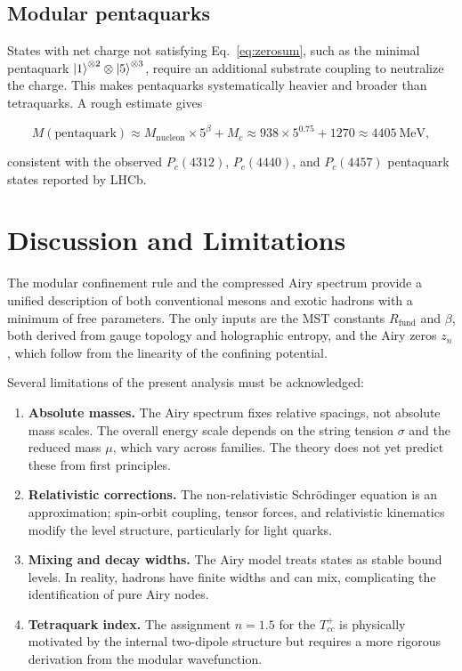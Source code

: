 \documentclass[12pt,a4paper]{article}
\theoremstyle{plain}
\theoremstyle{definition}
\theoremstyle{remark}
\begin{document}
\subsection{Modular pentaquarks}
States with net charge not satisfying Eq.~\eqref{eq:zerosum}, such as the minimal pentaquark \(\ket{1}^{\otimes 2} \otimes \ket{5}^{\otimes 3}\), require an additional substrate coupling to neutralize the charge. This makes pentaquarks systematically heavier and broader than tetraquarks. A rough estimate gives

\begin{equation}
M(\text{pentaquark}) \approx M_{\text{nucleon}} \times 5^\beta + M_c \approx 938 \times 5^{0.75} + 1270 \approx 4405\ \text{MeV},
\label{eq:penta}
\end{equation}

consistent with the observed \(P_c(4312)\), \(P_c(4440)\), and \(P_c(4457)\) pentaquark states reported by LHCb.

\section{Discussion and Limitations}
\label{sec:discussion}

The modular confinement rule and the compressed Airy spectrum provide a unified description of both conventional mesons and exotic hadrons with a minimum of free parameters. The only inputs are the MST constants \(R_{\text{fund}}\) and \(\beta\), both derived from gauge topology and holographic entropy, and the Airy zeros \(z_n\), which follow from the linearity of the confining potential.

Several limitations of the present analysis must be acknowledged:

\begin{enumerate}[label=(\roman*)]
    \item \textbf{Absolute masses.} The Airy spectrum fixes relative spacings, not absolute mass scales. The overall energy scale depends on the string tension \(\sigma\) and the reduced mass \(\mu\), which vary across families. The theory does not yet predict these from first principles.
    \item \textbf{Relativistic corrections.} The non-relativistic Schrödinger equation is an approximation; spin-orbit coupling, tensor forces, and relativistic kinematics modify the level structure, particularly for light quarks.
    \item \textbf{Mixing and decay widths.} The Airy model treats states as stable bound levels. In reality, hadrons have finite widths and can mix, complicating the identification of pure Airy nodes.
    \item \textbf{Tetraquark index.} The assignment \(n=1.5\) for the \(T_{cc}^+\) is physically motivated by the internal two-dipole structure but requires a more rigorous derivation from the modular wavefunction.
\end{enumerate}
\end{document}
